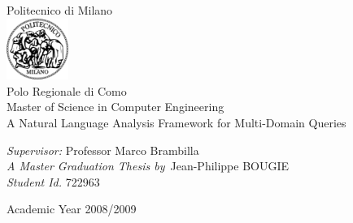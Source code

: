 \begin{titlepage}
  \setlength{\parindent}{0cm}
  \selectfont
  \begin{flushleft}
    \LARGE{Politecnico di Milano}\\[0.5cm]
    \includegraphics[width=0.15\textwidth]{images/logopolimi}\\[0.5cm]
    \large{Polo Regionale di Como}\\[2cm]
  
    \LARGE{Master of Science in Computer Engineering}\\[2cm]
  
    \Huge{A Natural Language Analysis Framework for Multi-Domain Queries}\\[2cm]
  
    \begin{large}
      \emph{Supervisor:} Professor Marco Brambilla \\
      \emph{A Master Graduation Thesis by}\ Jean-Philippe BOUGIE \\
      \emph{Student Id.} 722963\\[2.5cm]
    \end{large}
  \end{flushleft}
  
  \begin{flushright}
    Academic Year 2008/2009
  \end{flushright}
\end{titlepage}